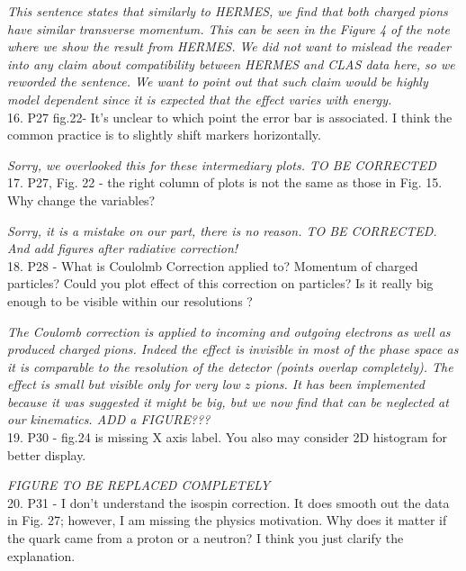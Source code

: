 \documentclass[12pt]{article}
\begin{document}
{\it This sentence states that similarly to HERMES, we find that both charged pions have similar
transverse momentum. This can be seen in the Figure 4 of the note where we show the result from 
HERMES. We did not want to mislead the reader into any claim about compatibility between 
HERMES and CLAS data here, so we reworded the sentence. We want to point out that such claim 
would be highly model dependent since it is expected that the effect varies with energy. } \\


16.
P27 fig.22-
 It's unclear to which point the error bar is associated. I think the common 
practice is to slightly shift markers horizontally.

{\it Sorry, we overlooked this for these intermediary plots. TO BE CORRECTED} \\

17.
P27, Fig. 22 - the right column of plots is not the same as those in Fig. 15.  Why change the 
variables?

{\it Sorry, it is a mistake on our part, there is no reason. TO BE CORRECTED. And
add figures after radiative correction!} \\



18.
P28 - What is Coulolmb Correction applied to? Momentum of charged particles? Could you 
plot effect of this correction on particles? Is it really big enough to be visible within our 
resolutions ?

{\it The Coulomb correction is applied to incoming and outgoing electrons as well as
produced charged pions. Indeed the effect is invisible in most of the phase space as
it is comparable to the resolution of the detector (points overlap completely). The 
effect is small but visible only for very low $z$ pions. It has been implemented 
because it was suggested it might be big, but we now find that can be neglected 
at our kinematics. ADD a FIGURE???} \\


19.
P30 - 
fig.24 is missing X axis label. You also may consider 2D histogram for better display.

{\it FIGURE TO BE REPLACED COMPLETELY} \\


20.
P31 - I don’t understand the isospin correction.  It does smooth out the data in Fig. 27; 
however, I am missing the physics motivation.  Why does it matter if the quark came from a 
proton or a neutron?  I think you just clarify the explanation.
\end{document}
